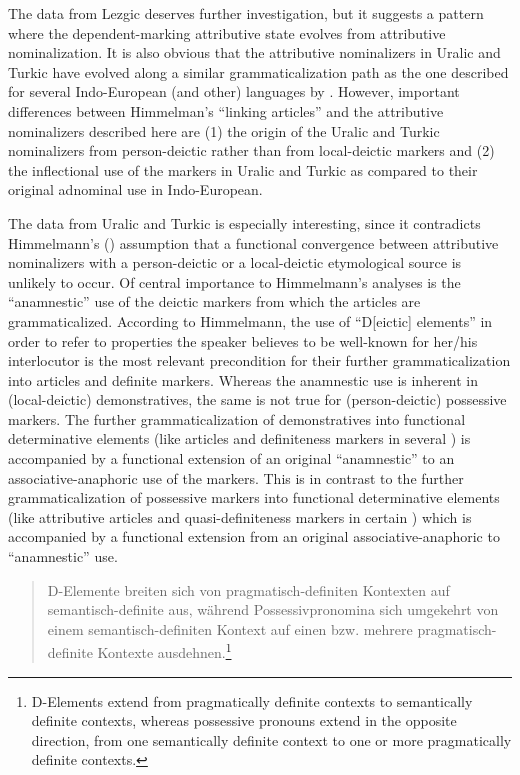 {
The data from Lezgic deserves further investigation, but it suggests a pattern where the dependent\hyp{}marking attributive state evolves from attributive nominalization. It is also obvious that the attributive nominalizers in Uralic and Turkic have evolved along a similar grammaticalization path as the one described for several Indo-European (and other) languages by \citet{himmelmann1997}. However, important differences between Himmelman's “linking articles” and the attributive nominalizers described here are (1) the origin of the Uralic and Turkic nominalizers from person-deictic rather than from local-deictic markers and (2) the inflectional use of the markers in Uralic and Turkic as compared to their original adnominal use in Indo-European.

The data from Uralic and Turkic is especially interesting, since it contradicts Himmelmann's (\citeyear[220–221]{himmelmann1997}) assumption that a functional convergence between attributive nominalizers with a person-deictic or a local-deictic etymological source is unlikely to occur. Of central importance to Himmelmann's analyses is the “anamnestic” use of the deictic markers from which the articles are grammaticalized. According to Himmelmann, the use of “D[eictic] elements” in order to refer to properties the speaker believes to be well-known for her/his interlocutor is the most relevant precondition for their further grammaticalization into articles and definite markers. Whereas the anamnestic use is inherent in (local-deictic) demonstratives, the same is not true for (person-deictic) possessive markers. The further grammaticalization of demonstratives into functional determinative elements (like articles and definiteness markers in several ) is accompanied by a functional extension of an original “anamnestic” to an associative-anaphoric use of the markers. This is in contrast to the further grammaticalization of possessive markers into functional determinative elements (like attributive articles and quasi-definiteness markers in certain ) which is accompanied by a functional extension from an original associative-anaphoric to “anamnestic” use.
\begin{quote}
D\hyp{}Elemente breiten sich von pragmatisch\hyp{}definiten Kontexten auf semantisch\hyp{}definite aus, während Possessivpronomina sich umgekehrt von einem semantisch\hyp{}definiten Kontext auf einen bzw. mehrere pragmatisch\hyp{}definite Kontexte ausdehnen.\footnote{D\hyp{}Elements extend from pragmatically definite contexts to semantically definite contexts, whereas possessive pronouns extend in the opposite direction, from one semantically definite context to one or more pragmatically definite contexts.} \citep[221]{himmelmann1997}
\end{quote}

}

